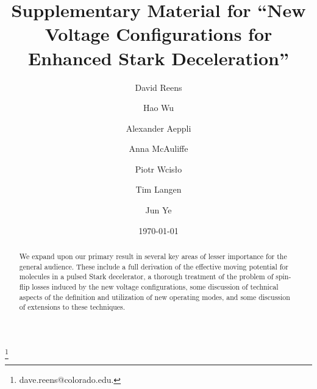 \documentclass[%
 reprint,
 amsmath,amssymb,
 aps,
pra,
]{revtex4-1}
\begin{document}
\title{Supplementary Material for ``New Voltage Configurations for Enhanced Stark Deceleration''}%

\author{David Reens}
\thanks{dave.reens@colorado.edu.}

\author{Hao Wu}
\author{Alexander Aeppli}
\author{Anna McAuliffe}
\author{Piotr Wcis\l o}
\author{Tim Langen}%

\author{Jun Ye}


\date{\today}



\begin{abstract}
We expand upon our primary result in several key areas of lesser importance for the general audience. These include a full derivation of the effective moving potential for molecules in a pulsed Stark decelerator, a thorough treatment of the problem of spin-flip losses induced by the new voltage configurations, some discussion of technical aspects of the definition and utilization of new operating modes, and some discussion of extensions to these techniques.
\end{abstract}

\maketitle


\end{document}

